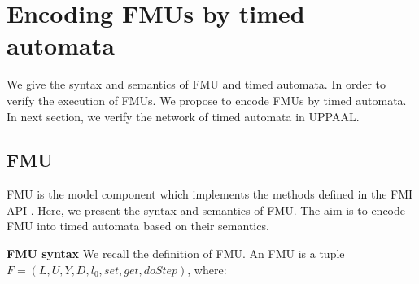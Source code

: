 
\section{Encoding FMUs by timed automata}
\label{sec:fmi}
We give the syntax and semantics of FMU and timed automata. In order to verify the  execution of FMUs. We propose to encode FMUs by timed automata. In next section, we verify the network of timed automata in UPPAAL.
\subsection{FMU}
FMU is the model component which implements the methods defined in the FMI API \cite{Tripakis15}. Here, we present the syntax and semantics of FMU. The aim is to encode FMU into timed automata based on their semantics. 
\begin{definition}
\textbf{FMU syntax}
We recall the definition of FMU. An FMU is a tuple $F=(L,U,Y,D,l_{0},set,get,doStep)$, where:
\end{definition}
